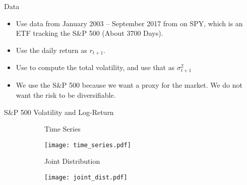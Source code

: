 \documentclass[smaller, aspectratio=169]{beamer}
\begin{document}
\begin{frame}[c]{Data}
    \begin{itemize}
        \item Use data from January 2003 -- September 2017  from on SPY, which is an ETF tracking the S\&P 500 (About 3700 Days).
            \bigskip
%
        \item Use the daily return as $r_{t+1}$.
            \bigskip
%
        \item Use \textcite{sangrey2018jumps} to compute the total volatility, and use that as $\sigma^2_{t+1}$
            \bigskip
%
        \item We use the S\&P 500 because we want a proxy for the market. We do not want the risk to be diversifiable.
    \end{itemize}
\end{frame}

\begin{frame}[c]{S\&P 500 Volatility and Log-Return}

    \begin{figure}[htb]
    
        \begin{subfigure}[t]{.54\textwidth}
            \centering
            Time Series

            \texttt{[image: time\_series.pdf]}
        \end{subfigure}%
        \hfill
        \begin{subfigure}[t]{.44\textwidth}
            \centering
            Joint Distribution

            \texttt{[image: joint\_dist.pdf]}
        \end{subfigure}
    \end{figure}

\end{frame}
\end{document}
